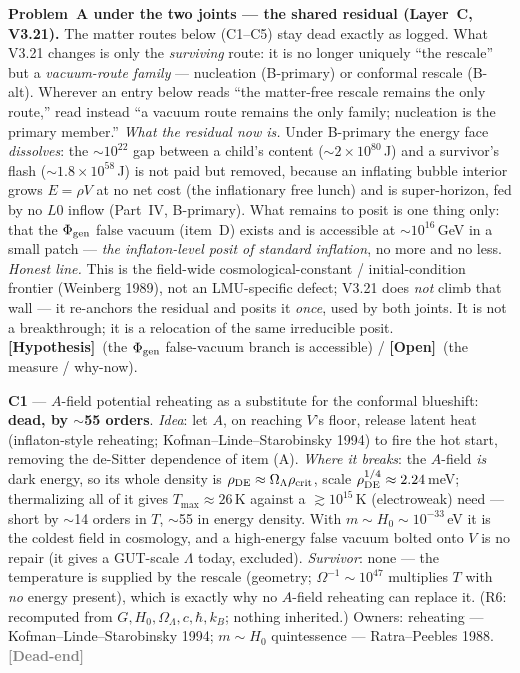 \documentclass[11pt]{article}
\newcommand{\hyp}{\textcolor{orange!80!black}{\textbf{[Hypothesis]}}}
\newcommand{\open}{\textcolor{red!70!black}{\textbf{[Open]}}}
\newcommand{\dead}{\textcolor{gray}{\textbf{[Dead-end]}}}
\begin{document}
\medskip\noindent\textbf{Problem~A under the two joints --- the shared residual (Layer~C, V3.21).} The matter routes below (C1--C5) stay dead exactly as logged. What V3.21 changes is only the \emph{surviving} route: it is no longer uniquely ``the rescale'' but a \emph{vacuum-route family} --- nucleation (B-primary) or conformal rescale (B-alt). Wherever an entry below reads ``the matter-free rescale remains the only route,'' read instead ``a vacuum route remains the only family; nucleation is the primary member.'' \emph{What the residual now is.} Under B-primary the energy face \emph{dissolves}: the $\sim\!10^{22}$ gap between a child's content ($\sim\!2\times10^{80}$\,J) and a survivor's flash ($\sim\!1.8\times10^{58}$\,J) is not paid but removed, because an inflating bubble interior grows $E=\rho V$ at no net cost (the inflationary free lunch) and is super-horizon, fed by no $L0$ inflow (Part~IV, B-primary). What remains to posit is one thing only: that the $\Phi_{\rm gen}$ false vacuum (item~D) exists and is accessible at $\sim\!10^{16}$\,GeV in a small patch --- \emph{the inflaton-level posit of standard inflation}, no more and no less. \emph{Honest line.} This is the field-wide cosmological-constant / initial-condition frontier (Weinberg 1989), not an LMU-specific defect; V3.21 does \emph{not} climb that wall --- it re-anchors the residual and posits it \emph{once}, used by both joints. It is not a breakthrough; it is a relocation of the same irreducible posit. \hyp\ (the $\Phi_{\rm gen}$ false-vacuum branch is accessible) / \open\ (the measure / why-now).

\textbf{C1} --- $A$-field potential reheating as a substitute for the conformal blueshift: \textbf{dead, by $\sim$55 orders}. \emph{Idea}: let $A$, on reaching $V$'s floor, release latent heat (inflaton-style reheating; Kofman--Linde--Starobinsky 1994) to fire the hot start, removing the de-Sitter dependence of item (A). \emph{Where it breaks}: the $A$-field \emph{is} dark energy, so its whole density is $\rho_{\rm DE}\approx\Omega_\Lambda\rho_{\rm crit}$, scale $\rho_{\rm DE}^{1/4}\approx2.24$\,meV; thermalizing all of it gives $T_{\max}\approx26$\,K against a $\gtrsim10^{15}$\,K (electroweak) need --- short by $\sim$14 orders in $T$, $\sim$55 in energy density. With $m\sim H_0\sim10^{-33}$\,eV it is the coldest field in cosmology, and a high-energy false vacuum bolted onto $V$ is no repair (it gives a GUT-scale $\Lambda$ today, excluded). \emph{Survivor}: none --- the temperature is supplied by the rescale (geometry; $\Omega^{-1}\sim10^{47}$ multiplies $T$ with \emph{no} energy present), which is exactly why no $A$-field reheating can replace it. (R6: recomputed from $G,H_0,\Omega_\Lambda,c,\hbar,k_B$; nothing inherited.) Owners: reheating --- Kofman--Linde--Starobinsky 1994; $m\sim H_0$ quintessence --- Ratra--Peebles 1988. \dead\quad
\end{document}
